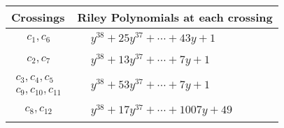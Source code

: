 \documentclass[1p]{elsarticle_modified}
\theoremstyle{definition}
\begin{document}
\begin{tabular}{m{50pt}|m{274pt}}
Crossings & \hspace{64pt}Riley Polynomials at each crossing \\
\hline $$\begin{aligned}c_{1},c_{6}\end{aligned}$$&$\begin{aligned}
&y^{38}+25 y^{37}+\cdots+43 y+1
\end{aligned}$\\
\hline $$\begin{aligned}c_{2},c_{7}\end{aligned}$$&$\begin{aligned}
&y^{38}+13 y^{37}+\cdots+7 y+1
\end{aligned}$\\
\hline $$\begin{aligned}c_{3},c_{4},c_{5}\\c_{9},c_{10},c_{11}\end{aligned}$$&$\begin{aligned}
&y^{38}+53 y^{37}+\cdots+7 y+1
\end{aligned}$\\
\hline $$\begin{aligned}c_{8},c_{12}\end{aligned}$$&$\begin{aligned}
&y^{38}+17 y^{37}+\cdots+1007 y+49
\end{aligned}$\\
\hline
\end{tabular}
\vskip 2pc
\end{document}
